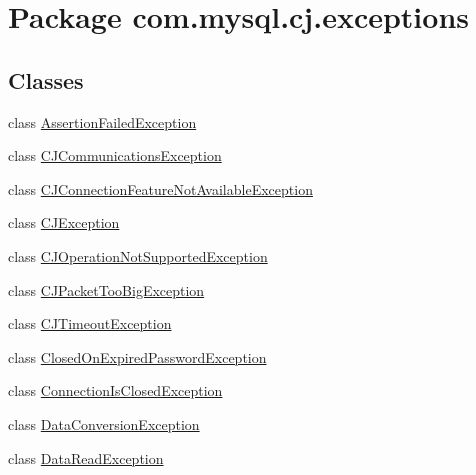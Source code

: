 \hypertarget{namespacecom_1_1mysql_1_1cj_1_1exceptions}{}\section{Package com.\+mysql.\+cj.\+exceptions}
\label{namespacecom_1_1mysql_1_1cj_1_1exceptions}
\subsection*{Classes}
\begin{DoxyCompactItemize}
\item 
class \mbox{\hyperlink{classcom_1_1mysql_1_1cj_1_1exceptions_1_1_assertion_failed_exception}{Assertion\+Failed\+Exception}}
\item 
class \mbox{\hyperlink{classcom_1_1mysql_1_1cj_1_1exceptions_1_1_c_j_communications_exception}{C\+J\+Communications\+Exception}}
\item 
class \mbox{\hyperlink{classcom_1_1mysql_1_1cj_1_1exceptions_1_1_c_j_connection_feature_not_available_exception}{C\+J\+Connection\+Feature\+Not\+Available\+Exception}}
\item 
class \mbox{\hyperlink{classcom_1_1mysql_1_1cj_1_1exceptions_1_1_c_j_exception}{C\+J\+Exception}}
\item 
class \mbox{\hyperlink{classcom_1_1mysql_1_1cj_1_1exceptions_1_1_c_j_operation_not_supported_exception}{C\+J\+Operation\+Not\+Supported\+Exception}}
\item 
class \mbox{\hyperlink{classcom_1_1mysql_1_1cj_1_1exceptions_1_1_c_j_packet_too_big_exception}{C\+J\+Packet\+Too\+Big\+Exception}}
\item 
class \mbox{\hyperlink{classcom_1_1mysql_1_1cj_1_1exceptions_1_1_c_j_timeout_exception}{C\+J\+Timeout\+Exception}}
\item 
class \mbox{\hyperlink{classcom_1_1mysql_1_1cj_1_1exceptions_1_1_closed_on_expired_password_exception}{Closed\+On\+Expired\+Password\+Exception}}
\item 
class \mbox{\hyperlink{classcom_1_1mysql_1_1cj_1_1exceptions_1_1_connection_is_closed_exception}{Connection\+Is\+Closed\+Exception}}
\item 
class \mbox{\hyperlink{classcom_1_1mysql_1_1cj_1_1exceptions_1_1_data_conversion_exception}{Data\+Conversion\+Exception}}
\item 
class \mbox{\hyperlink{classcom_1_1mysql_1_1cj_1_1exceptions_1_1_data_read_exception}{Data\+Read\+Exception}}
\item 

\end{DoxyCompactItemize}
